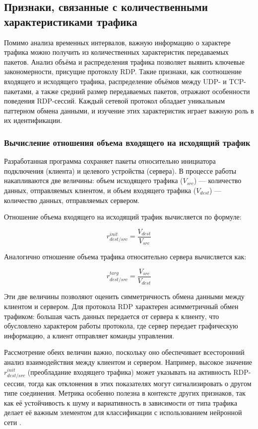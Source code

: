 \documentclass[bachelor, och, coursework]{SCWorks}
\begin{document}
\subsection{Признаки, связанные с количественными характеристиками трафика}


Помимо анализа временных интервалов, важную информацию о характере трафика можно получить из количественных характеристик передаваемых пакетов.
Анализ объёма и распределения трафика позволяет выявить ключевые закономерности, присущие протоколу RDP. Такие признаки, как соотношение 
входящего и исходящего трафика, распределение объёмов между UDP- и TCP-пакетами, а также средний размер передаваемых пакетов, отражают 
особенности поведения RDP-сессий. Каждый сетевой протокол обладает уникальным паттерном обмена данными, и изучение этих характеристик 
играет важную роль в их идентификации.

\subsubsection{Вычисление отношения объема входящего на исходящий трафик}

Разработанная программа сохраняет пакеты относительно инициатора подключения (клиента) и целевого устройства (сервера). В процессе работы накапливаются 
две величины: объем исходящего трафика ($V_{src}$) — количество данных, отправляемых клиентом, и объем входящего трафика ($V_{dest}$) — количество данных, 
отправляемых сервером.

Отношение объема входящего на исходящий трафик вычисляется по формуле:

\begin{equation}
  r_{dest/src}^{init} = \frac{V_{dest}}{V_{src}}
\end{equation}

Аналогично отношение объема трафика относительно сервера вычисляется как:

\begin{equation}
  r_{dest/src}^{targ} = \frac{V_{src}}{V_{dest}}
\end{equation}

Эти две величины позволяют оценить симметричность обмена данными между клиентом и сервером. Для протокола RDP характерен асимметричный обмен 
трафиком: большая часть данных передается от сервера к клиенту, что обусловлено характером работы протокола, где сервер передает графическую 
информацию, а клиент отправляет команды управления.

Рассмотрение обеих величин важно, поскольку оно обеспечивает всесторонний анализ взаимодействия между клиентом и сервером. Например, высокое 
значение $r_{dest/src}^{init}$ (преобладание входящего трафика) может указывать на активность RDP-сессии, тогда как отклонения в этих показателях 
могут сигнализировать о другом типе соединения. Метрика особенно полезна в контексте других признаков, так как её устойчивость к шуму и вариативность 
в зависимости от типа трафика делает её важным элементом для классификации с использованием нейронной сети \cite{lib2}.
\end{document}
